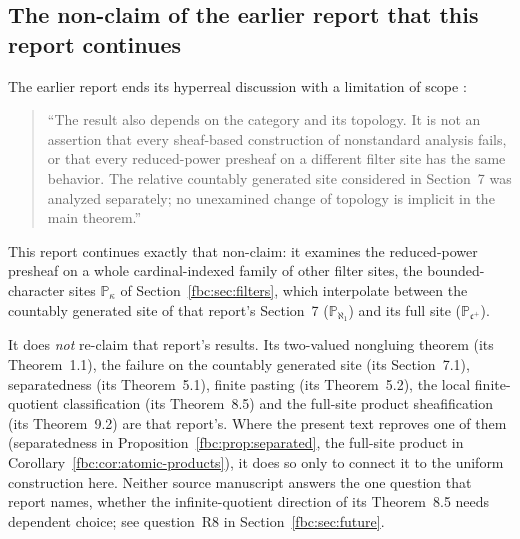 \documentclass[11pt,letterpaper]{article}
\theoremstyle{definition}
\theoremstyle{remark}
\newcommand{\PP}{\mathbb P}
\newcommand{\cc}{\mathfrak c}
\begin{document}
\subsection{The non-claim of the earlier report that this report continues}
\label{fbc:sec:nonclaim}
The earlier report ends its hyperreal discussion with a limitation of
scope \cite[Section~10]{Repo}:
\begin{quote}
``The result also depends on the category and its topology. It is not an
assertion that every sheaf-based construction of nonstandard analysis
fails, or that every reduced-power presheaf on a different filter site
has the same behavior. The relative countably generated site considered
in Section~7 was analyzed separately; no unexamined change of topology
is implicit in the main theorem.''
\end{quote}
This report continues exactly that non-claim: it examines the
reduced-power presheaf on a whole cardinal-indexed family of other filter
sites, the bounded-character sites $\PP_\kappa$ of
Section~\ref{fbc:sec:filters}, which interpolate between the countably
generated site of that report's Section~7 ($\PP_{\aleph_1}$) and its full
site ($\PP_{\cc^+}$).

It does \emph{not} re-claim that report's results. Its two-valued
nongluing theorem (its Theorem~1.1), the failure on the countably
generated site (its Section~7.1), separatedness (its Theorem~5.1), finite
pasting (its Theorem~5.2), the local finite-quotient classification (its Theorem~8.5) and
the full-site product sheafification (its Theorem~9.2) are that report's.
Where the present text reproves one of them (separatedness in
Proposition~\ref{fbc:prop:separated}, the full-site product in
Corollary~\ref{fbc:cor:atomic-products}), it does so only to connect it
to the uniform construction here. Neither source manuscript answers the
one question that report names, whether the infinite-quotient direction
of its Theorem~8.5 needs dependent choice; see question~R8 in
Section~\ref{fbc:sec:future}.
\end{document}
